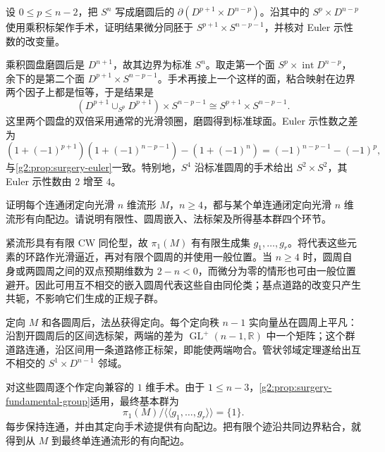 \begin{exercise}\label{g2:ex:standard-sphere-surgery}
	设 \(0\le p\le n-2\)，把 \(S^n\) 写成磨圆后的 \(\partial(D^{p+1}\times D^{n-p})\)。沿其中的 \(S^p\times D^{n-p}\) 使用乘积标架作手术，证明结果微分同胚于 \(S^{p+1}\times S^{n-p-1}\)，并核对 Euler 示性数的改变量。
\end{exercise}
\begin{solution}
	乘积圆盘磨圆后是 \(D^{n+1}\)，故其边界为标准 \(S^n\)。取走第一个面 \(S^p\times\operatorname{int}D^{n-p}\)，余下的是第二个面 \(D^{p+1}\times S^{n-p-1}\)。手术再接上一个这样的面，粘合映射在边界两个因子上都是恒等，于是结果是
	\[
		(D^{p+1}\cup_{S^p}D^{p+1})\times S^{n-p-1}
		\cong S^{p+1}\times S^{n-p-1}.
	\]
	这里两个圆盘的双倍采用通常的光滑领圈，磨圆得到标准球面。Euler 示性数之差为
	\[
		(1+(-1)^{p+1})(1+(-1)^{n-p-1})-(1+(-1)^n)
		=(-1)^{n-p-1}-(-1)^p,
	\]
	与\cref{g2:prop:surgery-euler}一致。特别地，\(S^4\) 沿标准圆周的手术给出 \(S^2\times S^2\)，其 Euler 示性数由 \(2\) 增至 \(4\)。
\end{solution}

\begin{exercise}\label{g2:ex:kill-fundamental-group-by-surgery}
	证明每个连通闭定向光滑 \(n\) 维流形 \(M\)，\(n\ge4\)，都与某个单连通闭定向光滑 \(n\) 维流形有向配边。请说明有限性、圆周嵌入、法标架及所得基本群四个环节。
\end{exercise}
\begin{solution}
	紧流形具有有限 CW 同伦型，故 \(\pi_1(M)\) 有有限生成集 \(g_1,\ldots,g_r\)。将代表这些元素的环路作光滑逼近，再对有限个圆周的并使用一般位置。当 \(n\ge4\) 时，圆周自身或两圆周之间的双点预期维数为 \(2-n<0\)，而微分为零的情形也可由一般位置避开。因此可用互不相交的嵌入圆周代表这些自由同伦类；基点道路的改变只产生共轭，不影响它们生成的正规子群。

	定向 \(M\) 和各圆周后，法丛获得定向。每个定向秩 \(n-1\) 实向量丛在圆周上平凡：沿割开圆周后的区间选标架，两端的差为 \(\operatorname{GL}^+(n-1,\mathbb R)\) 中一个矩阵；这个群道路连通，沿区间用一条道路修正标架，即能使两端吻合。管状邻域定理遂给出互不相交的 \(S^1\times D^{n-1}\) 邻域。

	对这些圆周逐个作定向兼容的 \(1\) 维手术。由于 \(1\le n-3\)，\cref{g2:prop:surgery-fundamental-group}适用，最终基本群为
	\[
		\pi_1(M)/\langle\!\langle g_1,\ldots,g_r\rangle\!\rangle=\{1\}.
	\]
	每步保持连通，并由其定向手术迹提供有向配边。把有限个迹沿共同边界粘合，就得到从 \(M\) 到最终单连通流形的有向配边。
\end{solution}

